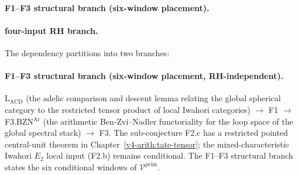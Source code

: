 \paragraph{F1--F3 structural branch (six-window placement).}
\begin{center}
\end{center}

\paragraph{four-input RH branch.}
\begin{center}
\end{center}

The dependency partitions into two branches:

\paragraph{F1--F3 structural branch (six-window placement, RH-independent).}
\(\mathrm{L}_{\mathrm{ACD}}\) (the adelic comparison and descent
lemma relating the global spherical category to the restricted tensor
product of local Iwahori categories) \(\to\) F1 \(\to\)
F3.BZN\(^{\mathrm{Ar}}\) (the arithmetic Ben-Zvi--Nadler functoriality
for the loop space of the global spectral stack) \(\to\) F3. The
sub-conjecture F2.c has a restricted pointed central-unit theorem in
Chapter~\ref{v4-arith:tate-tensor}; the mixed-characteristic Iwahori
\(E_{2}\) local input (F2.b) remains conditional.  The F1--F3
structural branch states the six conditional windows of
\(\mathcal{V}^{\mathrm{prim}}\).

